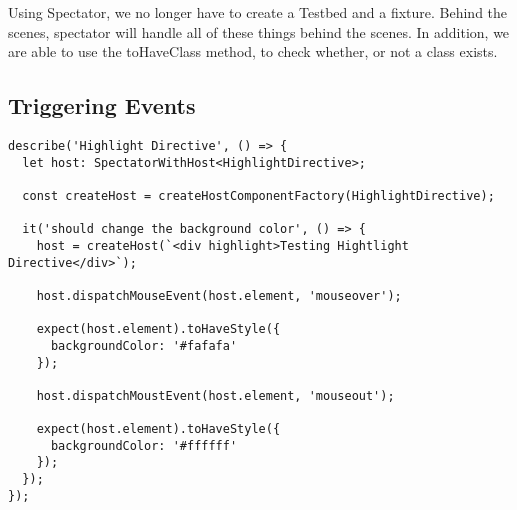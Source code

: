 Using Spectator, we no longer have to create a Testbed and a fixture. Behind
the scenes, spectator will handle all of these things behind the scenes. In
addition, we are able to use the toHaveClass method, to check whether, or not
a class exists.

\subsection{ Triggering Events }

\begin{lstlisting}
describe('Highlight Directive', () => {
  let host: SpectatorWithHost<HighlightDirective>;

  const createHost = createHostComponentFactory(HighlightDirective);

  it('should change the background color', () => {
    host = createHost(`<div highlight>Testing Hightlight Directive</div>`);

    host.dispatchMouseEvent(host.element, 'mouseover');

    expect(host.element).toHaveStyle({
      backgroundColor: '#fafafa'
    });

    host.dispatchMoustEvent(host.element, 'mouseout');

    expect(host.element).toHaveStyle({
      backgroundColor: '#ffffff'
    });
  });
});
\end{lstlisting}
